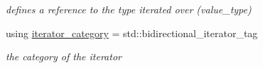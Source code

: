 \begin{DoxyCompactItemize}
\begin{DoxyCompactList}\small\item\em defines a reference to the type iterated over (value\+\_\+type) \end{DoxyCompactList}\item 
using \hyperlink{classnlohmann_1_1detail_1_1iter__impl_ad9e091f5c70b34b5b1abc1ab15fd9106}{iterator\+\_\+category} = std\+::bidirectional\+\_\+iterator\+\_\+tag\hypertarget{classnlohmann_1_1detail_1_1iter__impl_ad9e091f5c70b34b5b1abc1ab15fd9106}{}\label{classnlohmann_1_1detail_1_1iter__impl_ad9e091f5c70b34b5b1abc1ab15fd9106}

\begin{DoxyCompactList}\small\item\em the category of the iterator \end{DoxyCompactList}\end{DoxyCompactItemize}

